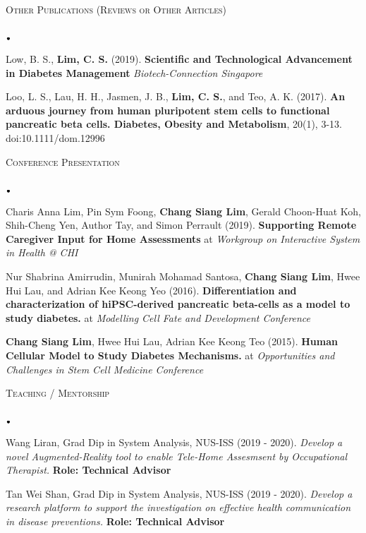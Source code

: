 \documentclass[11pt]{article}
\newcommand{\lineunder}{\vspace*{-8pt} \\ \hspace*{-18pt} \hrulefill \\}
\newcommand{\header}[1]{{\hspace*{-15pt}\vspace*{6pt} \textsc{#1}} \vspace*{-6pt} \lineunder}
\newcommand{\lbt}{\,\begin{picture}(-1,1)(-1,-3)\circle*{3}\end{picture}\ }
\newenvironment{achievements}{
    \begin{list}{$\lbt$}{
        \topsep 0pt
        \itemsep 0pt
        \addtolength{\leftmargin}{-0.1in}
    }
}
{
    \vspace*{4pt}
    \end{list}
}
\begin{document}
\header{Other Publications (Reviews or Other Articles)}
\vspace*{2mm}
\begin{achievements}
\justifying
\item Low, B. S., \textbf{Lim, C. S.} (2019). 
\textbf{Scientific and Technological Advancement in Diabetes Management} 
\textit{Biotech-Connection Singapore}
\item {Loo, L. S., Lau, H. H., Jasmen, J. B., \textbf{Lim, C. S.}, and Teo, A. K. (2017). 
\textbf{An arduous journey from human pluripotent stem cells to functional pancreatic beta cells. 
Diabetes, Obesity and Metabolism}, 20(1), 3-13. doi:10.1111/dom.12996}
\end{achievements}
\hfill{}

\header{Conference Presentation}
\vspace*{2mm}
\begin{achievements}
\justifying
\item Charis Anna Lim, Pin Sym Foong, \textbf{Chang Siang Lim}, Gerald Choon-Huat Koh, Shih-Cheng Yen, Author Tay, and Simon Perrault
(2019). \textbf{Supporting Remote Caregiver Input for Home Assessments} at 
\textit{Workgroup on Interactive System in Health @ CHI}
\item Nur Shabrina Amirrudin, Munirah Mohamad Santosa, \textbf{Chang Siang Lim}, 
Hwee Hui Lau, and Adrian Kee Keong Yeo (2016). 
\textbf{Differentiation and characterization of hiPSC-derived pancreatic beta-cells as a model 
to study diabetes.} at \textit{Modelling Cell Fate and Development Conference}
\item \textbf{Chang Siang Lim}, Hwee Hui Lau, Adrian Kee Keong Teo (2015). 
\textbf{Human Cellular Model to Study Diabetes Mechanisms.} at 
\textit{Opportunities and Challenges in Stem Cell Medicine Conference}
\end{achievements}
\hfill{}

\header{Teaching / Mentorship}
\vspace{2mm}
\begin{achievements}
\justifying
\item Wang Liran, Grad Dip in System Analysis, NUS-ISS (2019 - 2020). 
\textit{Develop a novel Augmented-Reality tool to enable Tele-Home Assesmsent by Occupational Therapist.}
\textbf{Role: Technical Advisor}
\item Tan Wei Shan, Grad Dip in System Analysis, NUS-ISS (2019 - 2020).
\textit{Develop a research platform to support the investigation on effective health communication in disease preventions.}
\textbf{Role: Technical Advisor}
\end{achievements}
\hfill{}
\end{document}
